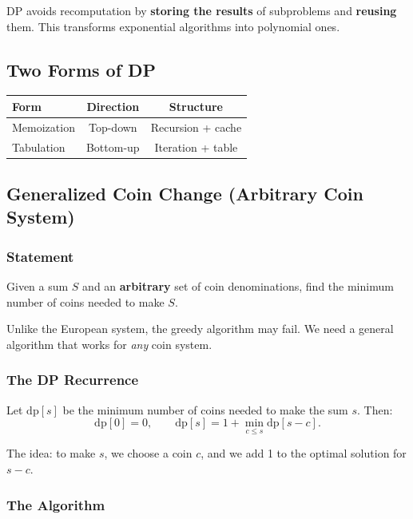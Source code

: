 \documentclass[11pt,a4paper]{article}
\begin{document}
DP avoids recomputation by \textbf{storing the results} of subproblems and \textbf{reusing} them. This transforms exponential algorithms into polynomial ones.

\subsection{Two Forms of DP}

\begin{center}
\begin{tabular}{lcc}
\toprule
Form & Direction & Structure \\
\midrule
Memoization & Top-down & Recursion + cache \\
Tabulation & Bottom-up & Iteration + table \\
\bottomrule
\end{tabular}
\end{center}

\subsection{Generalized Coin Change (Arbitrary Coin System)}

\subsubsection{Statement}

Given a sum \(S\) and an \textbf{arbitrary} set of coin denominations, find the minimum number of coins needed to make \(S\).

Unlike the European system, the greedy algorithm may fail. We need a general algorithm that works for \emph{any} coin system.

\subsubsection{The DP Recurrence}

Let \(\mathrm{dp}[s]\) be the minimum number of coins needed to make the sum \(s\). Then:
\[
\mathrm{dp}[0] = 0, \qquad \mathrm{dp}[s] = 1 + \min_{c \leq s} \mathrm{dp}[s - c].
\]

The idea: to make \(s\), we choose a coin \(c\), and we add 1 to the optimal solution for \(s - c\).

\subsubsection{The Algorithm}
\end{document}
